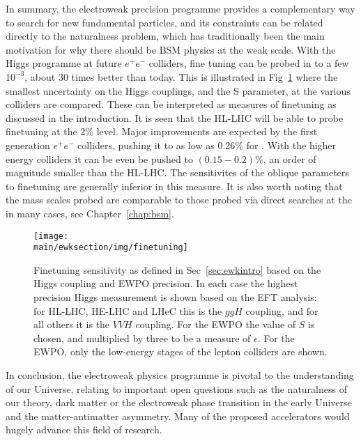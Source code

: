 \documentclass[../report.tex]{subfiles}
\providecommand{\main}{..}
\newcommand{\ew}{electroweak\xspace}
\newcommand{\epem}{e^{+}e^{-}}
\begin{document}
In summary, the \ew precision programme provides a complementary way to search for new fundamental particles, and its constraints can be related directly to the naturalness problem, which has traditionally been the main motivation for why there should be BSM physics at the weak scale. With the Higgs programme at future $\epem$ colliders, fine tuning can be probed in to a few $10^{-3}$, about 30 times better than today.
This is illustrated in Fig~\ref{fig:h3-finetune} where the smallest uncertainty on the Higgs couplings, and the S parameter, at the various colliders are compared. These can be interpreted as measures of  finetuning as discussed in the introduction. It is seen that the HL-LHC will be able to probe finetuning at the 2\% level. Major improvements are expected by the first generation $e^+e^-$ colliders, pushing it to as low as 0.26\% for \FCCee. With the higher energy colliders it can be even be pushed to $(0.15-0.2)\%$, an order of magnitude smaller than the HL-LHC. The sensitivites of the oblique parameters to finetuning are generally inferior in this measure. It is also worth noting that the mass scales probed are comparable to those probed via direct searches at the \HLLHC in many cases, see Chapter~\ref{chap:bsm}. 

\begin{figure}[!ht]
\centering
\texttt{[image: \\main/ewksection/img/finetuning]}
\caption{\label{fig:h3-finetune}
Finetuning sensitivity as defined in Sec~\ref{sec:ewkintro} based on the Higgs coupling and EWPO precision. In each case the highest precision Higgs measurement is shown based on the EFT analysis: for HL-LHC, HE-LHC and LHeC this is the $ggH$ coupling, and for all others it is the $VVH$ coupling. For the EWPO the value of $S$ is chosen, and multiplied by three to be a measure of $\epsilon$. For the EWPO, only the low-energy stages of the lepton colliders are shown.
}
\end{figure}

In conclusion, the \ew physics programme is pivotal to the understanding of our Universe, relating to important open questions such as the naturalness of our theory, dark matter or the \ew phase transition in the early Universe and the matter-antimatter asymmetry. Many of the proposed accelerators would hugely advance this field of research.

%
\end{document}
